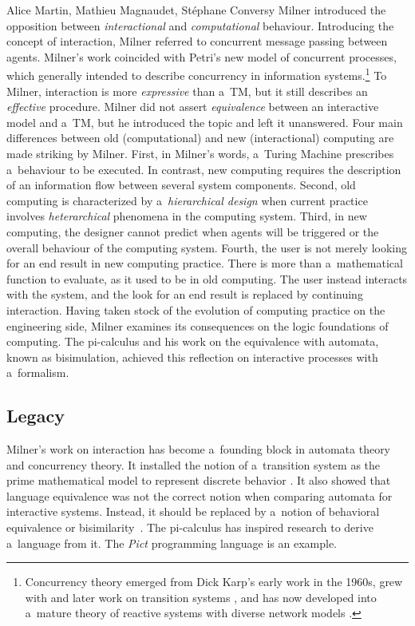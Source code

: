 \begin{artengenv2auth}{Alice Martin, Mathieu Magnaudet, Stéphane Conversy}
Milner introduced the opposition between \textit{interactional} and \textit{computational} behaviour. Introducing the concept of interaction, Milner \parencite*{Milner1975, Milner1982, Milner1983} referred to concurrent message passing between agents. Milner's work coincided with Petri’s \parencite*{Petri1980} new model of concurrent processes, which generally intended to describe concurrency in information systems.\footnote{Concurrency theory emerged from Dick Karp's early work in the 1960s, grew with \parencite{Petri1980} and later work on transition systems \parencite{Nielsen1981, Glabbeek2004},
and has now developed into a~mature theory of reactive systems \parencite{Harel1985} with diverse network models \parencites[for an overview, see][]{Lee1998}{Lee2006_modelsofcomputation}.}
 To Milner, interaction is more \textit{expressive} than a~TM, but it still describes an \textit{effective} procedure. Milner did not assert \textit{equivalence} between an interactive model and a~TM, but he introduced the topic \parencite{Milner1999} and left it unanswered. 
Four main differences between old (computational) and new (interactional) computing are made striking by Milner. First, in Milner’s words, a~Turing Machine prescribes a~behaviour to be executed. In contrast, new computing requires the description of an information flow between several system components. Second, old computing is characterized by a~\textit{hierarchical design} when current practice involves \textit{heterarchical} phenomena in the computing system. Third, in new computing, the designer cannot predict when agents will be triggered or the overall behaviour of the computing system. Fourth, the user is not merely looking for an end result in new computing practice. There is more than a~mathematical function to evaluate, as it used to be in old computing. The user instead interacts with the system, and the look for an end result is replaced by continuing interaction. Having taken stock of the evolution of computing practice on the engineering side, Milner examines its consequences on the logic foundations of computing. The pi-calculus and his work on the equivalence with automata, known as bisimulation, achieved this reflection on interactive processes \parencite{Milner1993, Milner1999} with a~formalism.

\subsection{Legacy}

Milner's work on interaction has become a~founding block in automata theory and concurrency theory. It installed the notion of a~transition system as the prime mathematical model to represent discrete behavior \parencite{Nielsen1981, Baldan2001, Glabbeek2004, Arbach2015}. It also showed that language equivalence was not the correct notion when comparing automata for interactive systems.
Instead, it should be replaced by a~notion of behavioral equivalence or bisimilarity~\parencite{Milner1999}. The pi-calculus has inspired research to derive a~language from it. The \textit{Pict} \parencite{Pierce2000} programming language is an example. 


\end{artengenv2auth}
